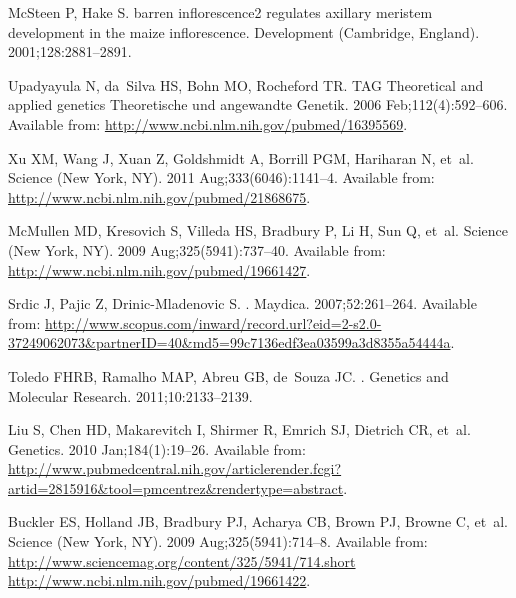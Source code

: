 \documentclass[10pt,letterpaper]{article}
\begin{document}
\begin{thebibliography}{}
McSteen P, Hake S.
\newblock barren inflorescence2 regulates axillary meristem development in the
  maize inflorescence.
\newblock Development (Cambridge, England). 2001;128:2881--2891.

Upadyayula N, da~Silva HS, Bohn MO, Rocheford TR.
\newblock TAG Theoretical and applied genetics Theoretische und angewandte
  Genetik. 2006 Feb;112(4):592--606.
\newblock Available from: \url{http://www.ncbi.nlm.nih.gov/pubmed/16395569}.

Xu XM, Wang J, Xuan Z, Goldshmidt A, Borrill PGM, Hariharan N, et~al.
\newblock Science (New York, NY). 2011 Aug;333(6046):1141--4.
\newblock Available from: \url{http://www.ncbi.nlm.nih.gov/pubmed/21868675}.

McMullen MD, Kresovich S, Villeda HS, Bradbury P, Li H, Sun Q, et~al.
\newblock Science (New York, NY). 2009 Aug;325(5941):737--40.
\newblock Available from: \url{http://www.ncbi.nlm.nih.gov/pubmed/19661427}.

Srdic J, Pajic Z, Drinic-Mladenovic S.
.
\newblock Maydica. 2007;52:261--264.
\newblock Available from:
  \url{http://www.scopus.com/inward/record.url?eid=2-s2.0-37249062073\&partnerID=40\&md5=99c7136edf3ea03599a3d8355a54444a}.

Toledo FHRB, Ramalho MAP, Abreu GB, de~Souza JC.
.
\newblock Genetics and Molecular Research. 2011;10:2133--2139.

Liu S, Chen HD, Makarevitch I, Shirmer R, Emrich SJ, Dietrich CR, et~al.
\newblock Genetics. 2010 Jan;184(1):19--26.
\newblock Available from:
  \url{http://www.pubmedcentral.nih.gov/articlerender.fcgi?artid=2815916\&tool=pmcentrez\&rendertype=abstract}.

Buckler ES, Holland JB, Bradbury PJ, Acharya CB, Brown PJ, Browne C, et~al.
\newblock Science (New York, NY). 2009 Aug;325(5941):714--8.
\newblock Available from:
  \url{http://www.sciencemag.org/content/325/5941/714.short
  http://www.ncbi.nlm.nih.gov/pubmed/19661422}.


\end{thebibliography}
\end{document}
